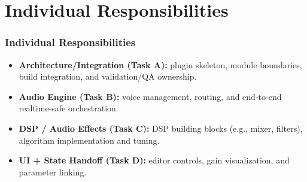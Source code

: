 \section{Individual Responsibilities}

\begin{frame}\frametitle{Individual Responsibilities}
\begin{itemize} [<+->]
    \item \textbf{Architecture/Integration (Task A):} plugin skeleton, module boundaries, build integration, and validation/QA ownership.
    \item \textbf{Audio Engine (Task B):} voice management, routing, and end-to-end realtime-safe orchestration.
    \item \textbf{DSP / Audio Effects (Task C):} DSP building blocks (e.g., mixer, filters), algorithm implementation and tuning.
    \item \textbf{UI + State Handoff (Task D):} editor controls, gain visualization, and parameter linking.
\vspace{0.5ex}

\end{itemize}
\end{frame}
